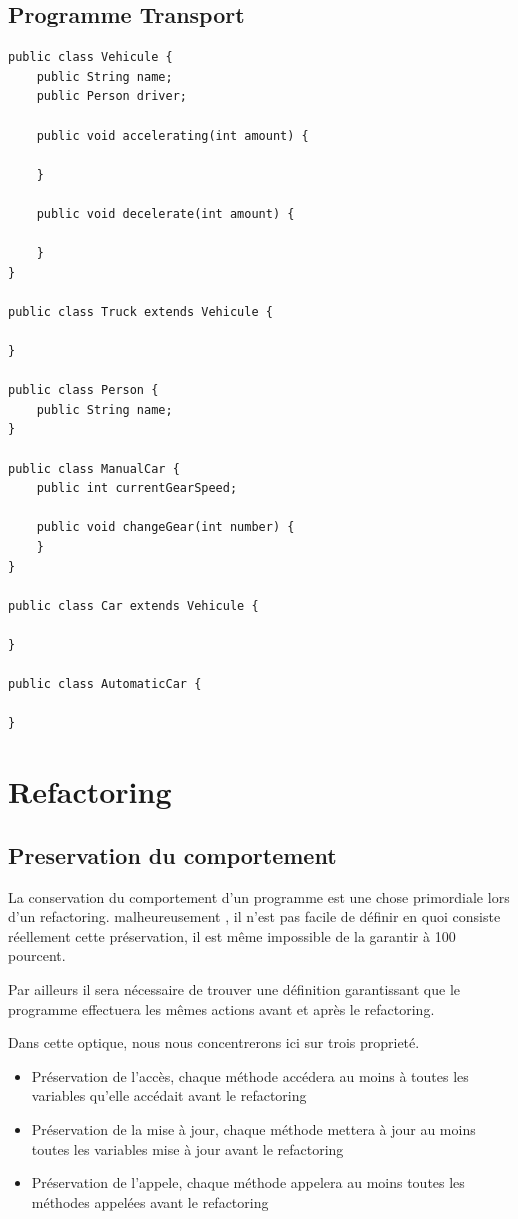 \documentclass[a4paper, 12pt]{article}
\begin{document}
\subsection{Programme Transport}

\begin{lstlisting}[frame=single]
public class Vehicule {
	public String name;
	public Person driver;

	public void accelerating(int amount) {

	}

	public void decelerate(int amount) {
	
	}
}

public class Truck extends Vehicule {

}

public class Person {
	public String name;
}

public class ManualCar {
	public int currentGearSpeed;
	
	public void changeGear(int number) {
	}
}

public class Car extends Vehicule {

}

public class AutomaticCar {

}
\end{lstlisting}

\newpage
\section{Refactoring}

\subsection{Preservation du comportement}
\label{subsec:preservationDuComportement}

La conservation du comportement d'un programme est une chose primordiale lors d'un refactoring. malheureusement , il n'est pas facile de définir en quoi consiste réellement cette préservation, il est même impossible de la garantir à 100 pourcent. 

Par ailleurs il sera nécessaire de trouver une définition garantissant que le programme effectuera les mêmes actions avant et après le refactoring. 

Dans cette optique, nous nous concentrerons ici sur trois proprieté.

\begin{itemize}[label=\textbullet]
\item Préservation de l'accès, chaque méthode accédera au moins à toutes les variables qu'elle accédait avant le refactoring
\item Préservation de la mise à jour, chaque méthode mettera à jour au moins toutes les variables mise à jour avant le refactoring
\item Préservation de l'appele, chaque méthode appelera au moins toutes les méthodes appelées avant le refactoring
\end{itemize}
\end{document}
